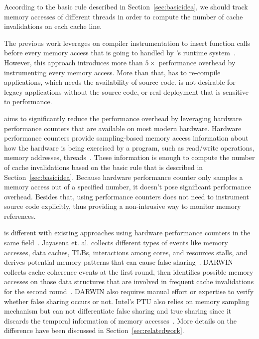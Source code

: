 According to the basic rule described in Section~\ref{sec:basicidea}, we should track memory accesses of different threads in order to compute the number of cache invalidations on each cache line. 

The previous work \Predator{} leverages on compiler instrumentation to insert function calls before every memory access that is going to handled by \Predator{}'s runtime system~\cite{Predator}. However, this approach introduces more than $5\times$ performance overhead by instrumenting every memory access. More than that, \Predator{} has to re-compile applications, which needs the availability of source code. \Predator{} is not desirable for legacy applications without the source code, or real deployment that is sensitive to performance. 

\cheetah{} aims to significantly reduce the performance overhead by leveraging hardware performance counters that are available on most modern hardware. Hardware performance counters provide sampling-based memory access information about how the hardware is being exercised by a program, such as read/write operations, memory addresses, threads~\cite{Mucci99papi}. These information is enough to compute the number of cache invalidations based on the basic rule that is described in Section~\ref{sec:basicidea}. Because hardware performance counter only samples a memory access out of a specified number, it doesn't pose significant performance overhead. 
Besides that, using performance counters does not need to instrument source code explicitly, thus providing a non-intrusive way to monitor memory references. 

\cheetah{} is different with existing approaches using hardware performance counters in the same field~\cite{mldetect, openmp, detect:ptu}. Jayasena et. al. collects different types of events like memory accesses, data caches, TLBs, interactions among cores, and resources stalls, and derives potential memory patterns that can cause false sharing~\cite{mldetect}. DARWIN collects cache coherence events at the first round, then identifies possible memory accesses on those data structures that are involved in frequent cache invalidations for the second round~\cite{openmp}. DARWIN also requires manual effort or expertise to verify whether false sharing occurs or not.  Intel's PTU also relies on memory sampling mechanism but can not differentiate false sharing and true sharing since it discards the temporal information of memory accesses~\cite{detect:ptu}. More details on the difference have been discussed in Section~\ref{sec:relatedwork}.



